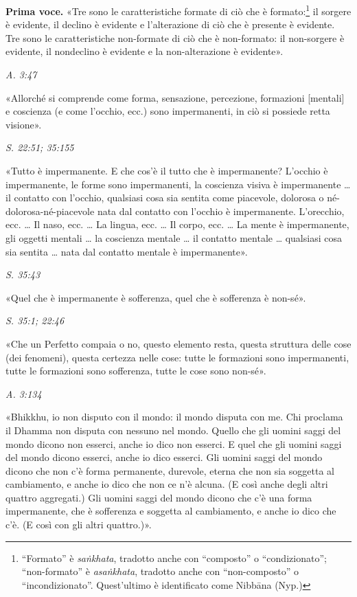 \textbf{Prima voce.} «Tre sono le caratteristiche formate di ciò che è
formato:\footnote{“Formato” è \emph{saṅkhata}, tradotto anche con “composto” o “condizionato”; “non-formato” è \emph{asaṅkhata}, tradotto anche con “non-composto” o “incondizionato”. Quest’ultimo è identificato come Nibbāna (Nyp.)}
il sorgere è evidente, il declino è evidente
e l’alterazione di ciò che è presente è evidente. Tre sono le
caratteristiche non-formate di ciò che è non-formato: il non-sorgere è
evidente, il nondeclino è evidente e la non-alterazione è evidente».


\emph{A. 3:47}


«Allorché si comprende come forma, sensazione, percezione, formazioni
[mentali] e coscienza (e come l’occhio, ecc.) sono impermanenti, in ciò
si possiede retta visione».


\emph{S. 22:51; 35:155}


«Tutto è impermanente. E che cos’è il tutto che è impermanente? L’occhio
è impermanente, le forme sono impermanenti, la coscienza visiva è
impermanente … il contatto con l’occhio, qualsiasi cosa sia sentita come
piacevole, dolorosa o né-dolorosa-né-piacevole nata dal contatto con
l’occhio è impermanente. L’orecchio, ecc. … Il naso, ecc. … La lingua,
ecc. … Il corpo, ecc. … La mente è impermanente, gli oggetti mentali …
la coscienza mentale … il contatto mentale … qualsiasi cosa sia sentita
… nata dal contatto mentale è impermanente».


\emph{S. 35:43}


«Quel che è impermanente è sofferenza, quel che è sofferenza è non-sé».


\emph{S. 35:1; 22:46}


«Che un Perfetto compaia o no, questo elemento resta, questa struttura
delle cose (dei fenomeni), questa certezza nelle cose: tutte le
formazioni sono impermanenti, tutte le formazioni sono sofferenza, tutte
le cose sono non-sé».


\emph{A. 3:134}


«Bhikkhu, io non disputo con il mondo: il mondo disputa con me. Chi
proclama il Dhamma non disputa con nessuno nel mondo. Quello che gli
uomini saggi del mondo dicono non esserci, anche io dico non esserci. E
quel che gli uomini saggi del mondo dicono esserci, anche io dico
esserci. Gli uomini saggi del mondo dicono che non c’è forma permanente,
durevole, eterna che non sia soggetta al cambiamento, e anche io dico
che non ce n’è alcuna. (E così anche degli altri quattro aggregati.) Gli
uomini saggi del mondo dicono che c’è una forma impermanente, che è
sofferenza e soggetta al cambiamento, e anche io dico che c’è. (E così
con gli altri quattro.)».


